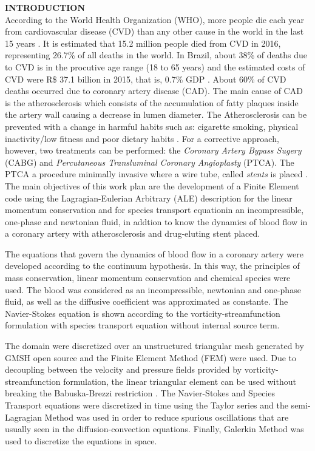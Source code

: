 \noindent\textbf{INTRODUCTION}
\\

According to the World Health Organization (WHO), more people die each year from cardiovascular disease (CVD) than any other cause in the world in the last 15 years \cite{oms2018}.
It is estimated that 15.2 million people died from CVD in 2016,
representing 26.7\% of all deaths in the world. 
In Brazil, about 38\% of deaths due to CVD is in the procutive age range
(18 to 65 years) and the estimated
costs of CVD were R\$ 37.1 billion
in 2015, that is, 0.7\% GDP \cite{siqueira2017}.
About 60\% of CVD deaths
occurred due to coronary artery disease (CAD).
The main cause of CAD is the atherosclerosis which consists of
the accumulation of fatty plaques inside the artery wall causing
a decrease in lumen diameter.
The Atherosclerosis can be prevented with a change in harmful habits
such as: cigarette smoking, physical inactivity/low fitness and poor dietary habits \cite{spring2013}.
For a corrective approach, however, two treatments can be performed:
the \textit{Coronary Artery Bypass Sugery} (CABG) and
\textit{Percutaneous Transluminal Coronary Angioplasty} (PTCA).
The PTCA a procedure minimally invasive where a wire tube,
called \textit{stents} is placed \cite{sigwart1987}.
The main objectives of this work plan are the development of a
Finite Element code using the Lagragian-Eulerian Arbitrary (ALE) description for the linear momentum conservation and for species transport equationin an incompressible, one-phase and newtonian fluid, in addtion to know the dynamics of blood flow in a coronary artery with atherosclerosis and drug-eluting stent placed.

\medskip
The equations that govern the dynamics of blood flow in a coronary artery were developed according to the continuum hypothesis.
In this way, the principles of mass conservation, linear momentum conservation and chemical species were used.
The blood was considered as an incompressible, newtonian and one-phase fluid, as well as the diffusive coefficient was approximated as constante.
The Navier-Stokes equation is shown according to the vorticity-streamfunction formulation with species transport equation without internal source term.

\medskip
The domain were discretized over an unstructured triangular mesh generated by GMSH open source \cite{gmsh} and the Finite Element Method (FEM) were used. 
Due to decoupling between the velocity and pressure fields provided by vorticity-streamfunction formulation, the linear triangular element can be used without breaking the Babuska-Brezzi restriction \cite{babuska1971}\cite{brezzi1974}.
The Navier-Stokes and Species Transport equations were discretized in time using the Taylor series and the semi-Lagragian Method \cite{pironneau1982} was used in order to reduce spurious oscillations that are usually seen in the diffusion-convection equations. Finally, Galerkin Method was used to discretize the equations in space. 

